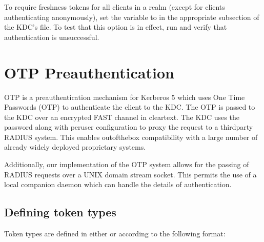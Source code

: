 \documentclass[letterpaper,10pt,english]{sphinxmanual}
\begin{document}
\begin{sphinxVerbatim}[commandchars=\\\{\}]
      
       
\end{sphinxVerbatim}

\sphinxAtStartPar
To require freshness tokens for all clients in a realm (except for
clients authenticating anonymously), set the
 variable to  in the appropriate
{\hyperref[\detokenize{admin/conf_files/kdc_conf:kdc-realms}]{}} subsection of the KDC’s {\hyperref[\detokenize{admin/conf_files/kdc_conf:kdc-conf-5}]{}} file.  To
test that this option is in effect, run 
and verify that authentication is unsuccessful.

\sphinxstepscope


\chapter{OTP Preauthentication}
\label{\detokenize{admin/otp:otp-preauthentication}}\label{\detokenize{admin/otp:otp-preauth}}\label{\detokenize{admin/otp::doc}}
\sphinxAtStartPar
OTP is a preauthentication mechanism for Kerberos 5 which uses One
Time Passwords (OTP) to authenticate the client to the KDC.  The OTP
is passed to the KDC over an encrypted FAST channel in clear\sphinxhyphen{}text.
The KDC uses the password along with per\sphinxhyphen{}user configuration to proxy
the request to a third\sphinxhyphen{}party RADIUS system.  This enables
out\sphinxhyphen{}of\sphinxhyphen{}the\sphinxhyphen{}box compatibility with a large number of already widely
deployed proprietary systems.

\sphinxAtStartPar
Additionally, our implementation of the OTP system allows for the
passing of RADIUS requests over a UNIX domain stream socket.  This
permits the use of a local companion daemon which can handle the
details of authentication.


\section{Defining token types}
\label{\detokenize{admin/otp:defining-token-types}}
\sphinxAtStartPar
Token types are defined in either {\hyperref[\detokenize{admin/conf_files/krb5_conf:krb5-conf-5}]{}} or
{\hyperref[\detokenize{admin/conf_files/kdc_conf:kdc-conf-5}]{}} according to the following format:
\end{document}
